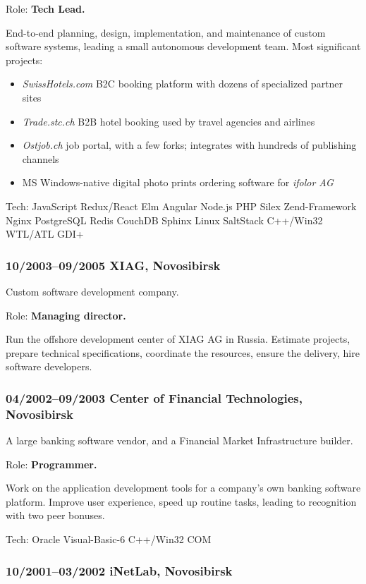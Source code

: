 \documentclass[a4paper, twocolumn, 10pt]{article}
\begin{document}
Role: \textbf{Tech Lead.}

End-to-end planning, design, implementation, and maintenance of custom software systems, leading a
small autonomous development team. Most significant projects:

\begin{itemize}
  \itemsep0em
  \item \emph{SwissHotels.com} B2C booking platform with dozens of specialized partner sites
  \item \emph{Trade.stc.ch} B2B hotel booking used by travel agencies and airlines
  \item \emph{Ostjob.ch} job portal, with a few forks; integrates with hundreds of publishing channels
  \item MS Windows-native digital photo prints ordering software for \emph{ifolor AG}
\end{itemize}

Tech: JavaScript Redux/React Elm Angular Node.js PHP Silex Zend-Framework Nginx PostgreSQL
Redis CouchDB Sphinx Linux SaltStack C++/Win32 WTL/ATL GDI+

\subsubsection*{10/2003--09/2005 XIAG, Novosibirsk}

Custom software development company.

Role: \textbf{Managing director.}

Run the offshore development center of XIAG AG in Russia. Estimate projects, prepare technical
specifications, coordinate the resources, ensure the delivery, hire software developers.

\subsubsection*{04/2002--09/2003 Center of Financial Technologies, Novosibirsk}

A large banking software vendor, and a Financial Market Infrastructure builder.

Role: \textbf{Programmer.}

Work on the application development tools for a company's own banking software platform. Improve
user experience, speed up routine tasks, leading to recognition with two peer bonuses.

Tech: Oracle Visual-Basic-6 C++/Win32 COM

\subsubsection*{10/2001--03/2002 iNetLab, Novosibirsk}
\end{document}
